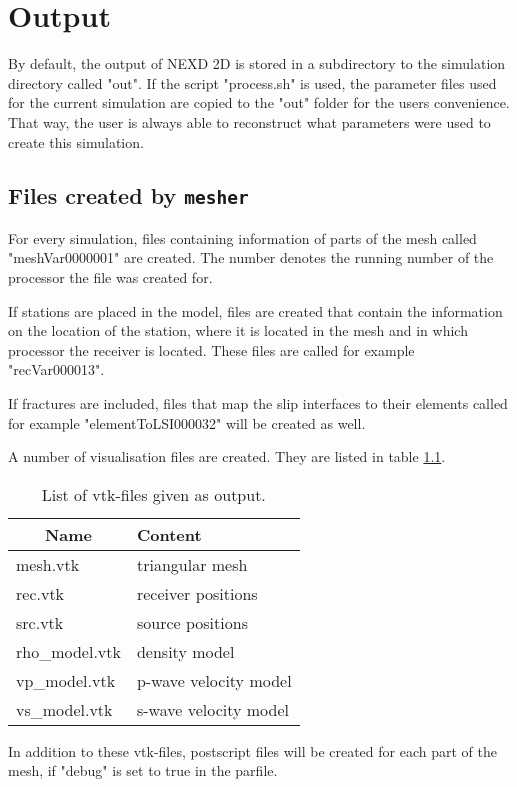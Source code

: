 \chapter{Output}
\label{chap:output}
	By default, the output of NEXD 2D is stored in a subdirectory to the simulation directory called "out". If the script "process.sh" is used, the parameter files used for the current simulation are copied to the "out" folder for the users convenience. That way, the user is always able to reconstruct what parameters were used to create this simulation. 
	
	\section{Files created by \texttt{mesher}}
	\label{sec:mesher}
		For every simulation, files containing information of parts of the mesh called "meshVar0000001" are created. The number denotes the running number of the processor the file was created for.
		
		If stations are placed in the model, files are created that contain the information on the location of the station, where it is located in the mesh and in which processor the receiver is located. These files are called for example "recVar000013".
		
		If fractures are included, files that map the slip interfaces to their elements called for example "elementToLSI000032" will be created as well.
		
		A number of visualisation files are created. They are listed in table \ref{tab:vtk_files}.
		\begin{table}[ht]
   			\centering
    		\caption{List of vtk-files given as output.}
    		\label{tab:vtk_files}
    		\begin{tabular}{@{} l p{5cm} @{}}
        		\toprule
        		\multicolumn{1}{c}{Name} & Content\\ 
        		\midrule
        		mesh.vtk & triangular mesh \\
        		rec.vtk & receiver positions \\    
       			src.vtk & source positions \\
        		rho\_model.vtk & density model \\
        		vp\_model.vtk & p-wave velocity model \\
        		vs\_model.vtk & s-wave velocity model \\
        		\bottomrule
    		\end{tabular}
		\end{table}
		In addition to these vtk-files, postscript files will be created for each part of the mesh, if "debug" is set to true in the parfile.

